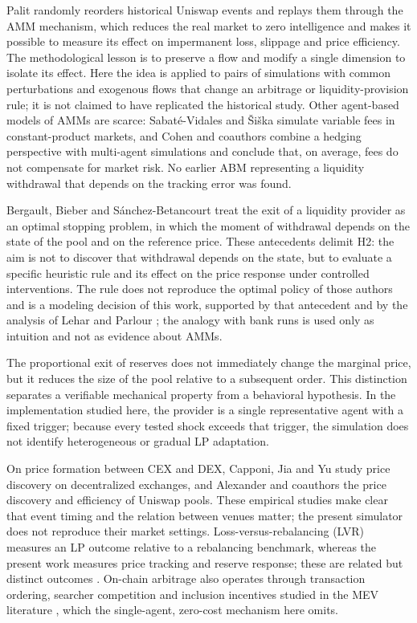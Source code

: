 Palit \cite{palit2022shuffled} randomly reorders historical Uniswap events and replays them through the AMM mechanism, which reduces the real market to zero intelligence and makes it possible to measure its effect on impermanent loss, slippage and price efficiency. The methodological lesson is to preserve a flow and modify a single dimension to isolate its effect. Here the idea is applied to pairs of simulations with common perturbations and exogenous flows that change an arbitrage or liquidity-provision rule; it is not claimed to have replicated the historical study. Other agent-based models of AMMs are scarce: Sabaté-Vidales and Šiška \cite{sabatevidales2023variable} simulate variable fees in constant-product markets, and Cohen and coauthors \cite{cohen2023inefficiency} combine a hedging perspective with multi-agent simulations and conclude that, on average, fees do not compensate for market risk. No earlier ABM representing a liquidity withdrawal that depends on the tracking error was found.

Bergault, Bieber and Sánchez-Betancourt \cite{bergault2025exit} treat the exit of a liquidity provider as an optimal stopping problem, in which the moment of withdrawal depends on the state of the pool and on the reference price. These antecedents delimit H2: the aim is not to discover that withdrawal depends on the state, but to evaluate a specific heuristic rule and its effect on the price response under controlled interventions. The rule does not reproduce the optimal policy of those authors and is a modeling decision of this work, supported by that antecedent and by the analysis of Lehar and Parlour \cite{lehar2025uniswap}; the analogy with bank runs \cite{diamond1983bank} is used only as intuition and not as evidence about AMMs.

The proportional exit of reserves does not immediately change the marginal price, but it reduces the size of the pool relative to a subsequent order. This distinction separates a verifiable mechanical property from a behavioral hypothesis. In the implementation studied here, the provider is a single representative agent with a fixed trigger; because every tested shock exceeds that trigger, the simulation does not identify heterogeneous or gradual LP adaptation.

On price formation between CEX and DEX, Capponi, Jia and Yu \cite{capponi2026price} study price discovery on decentralized exchanges, and Alexander and coauthors \cite{alexander2025price} the price discovery and efficiency of Uniswap pools. These empirical studies make clear that event timing and the relation between venues matter; the present simulator does not reproduce their market settings. Loss-versus-rebalancing (LVR) measures an LP outcome relative to a rebalancing benchmark, whereas the present work measures price tracking and reserve response; these are related but distinct outcomes \cite{milionis2022lvr,milionis2022quantifying}. On-chain arbitrage also operates through transaction ordering, searcher competition and inclusion incentives studied in the MEV literature \cite{daian2020flash,zhou2021hft}, which the single-agent, zero-cost mechanism here omits.

